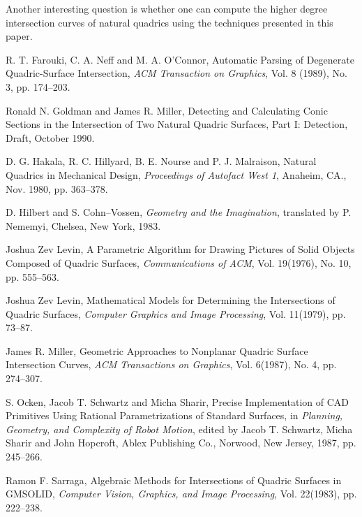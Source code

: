      Another interesting question is whether one can compute the higher degree
intersection curves of natural quadrics using the techniques presented in this
paper.


\newpage
\begin{thebibliography}{999}

     R. T. Farouki, C. A. Neff and M. A. O'Connor,
     Automatic Parsing of Degenerate Quadric-Surface Intersection,
     {\em ACM Transaction on Graphics},
     Vol. 8 (1989), No. 3, pp. 174--203.

     Ronald N. Goldman and James R. Miller,
     Detecting and Calculating Conic Sections in the Intersection of Two
     Natural Quadric Surfaces, Part I: Detection,
     Draft, October 1990.

     D. G. Hakala, R. C. Hillyard, B. E. Nourse and P. J. Malraison,
     Natural Quadrics in Mechanical Design,
     {\em Proceedings of Autofact West 1}, 
     Anaheim, CA., Nov. 1980, pp. 363--378.

     D. Hilbert and S. Cohn--Vossen,
     {\em Geometry and the Imagination},
     translated by P. Nememyi,
     Chelsea, New York, 1983.

     Joshua Zev Levin,
     A Parametric Algorithm for Drawing Pictures of Solid Objects Composed
          of Quadric Surfaces,
     {\em Communications of ACM},
     Vol. 19(1976), No. 10, pp. 555--563.

     Joshua Zev Levin,
     Mathematical Models for Determining the Intersections of Quadric Surfaces,
     {\em Computer Graphics and Image Processing},
     Vol. 11(1979), pp. 73--87.

     James R. Miller,
     Geometric Approaches to Nonplanar Quadric Surface Intersection Curves,
     {\em ACM Transactions on Graphics},
     Vol. 6(1987), No. 4, pp. 274--307.

     S. Ocken, Jacob T. Schwartz and Micha Sharir,
     Precise Implementation of CAD Primitives Using Rational Parametrizations
     of Standard Surfaces,
     in {\em Planning, Geometry, and Complexity of Robot Motion}, edited by
     Jacob T. Schwartz, Micha Sharir and John Hopcroft,
     Ablex Publishing Co., Norwood, New Jersey, 1987, pp. 245--266.

     Ramon F. Sarraga,
     Algebraic Methods for Intersections of Quadric Surfaces in GMSOLID,
     {\em Computer Vision, Graphics, and Image Processing},
     Vol. 22(1983), pp. 222--238.

\end{thebibliography}

